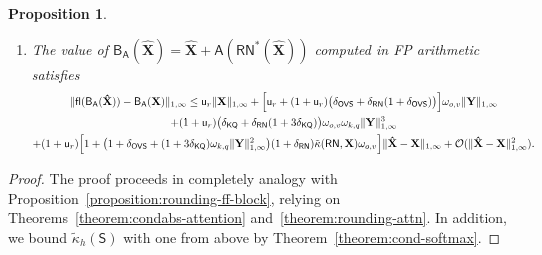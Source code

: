 \documentclass[namedate,webpdf,imanum]{ima-authoring-template}
\newcommand{\Matrix}[1]{\mathbf{#1}}
\newcommand{\Norm}[3][]{#1\| #2 #1\|_{\mathrm{#3}}}
\newcommand{\Layer}[1]{\mathsf{#1}}
\newcommand{\condabs}[3][]{\tilde{\kappa}_{\mathrm{#2}} #1( #3 #1)}
\newcommand{\fl}[2][]{\mathsf{fl}#1( #2 #1)}
\newcommand{\uh}{\mathsf{u}}
\newcommand{\Oh}[2][]{\mathcal{O}#1( #2 #1)}
\newtheorem{proposition}[theorem]{Proposition}%
\numberwithin{equation}{section}
\begin{document}
\begin{proposition}
\begin{enumerate}
\begin{multline*}
    \end{multline*}
    where $\Matrix{Y} = \Layer{RN}^*(\Matrix{X})$ and $\Tilde{\kappa}(\Layer{RN},\Matrix{X}) = \max_{1 \leq n \leq N} \condabs{\infty,\infty}{\Layer{RN},\Matrix{x}_n}$.
    \item The value of $\Layer{B}_{\Layer{A}}(\Matrix{\hat{X}}) = \Matrix{\hat{X}} + \Layer{A}(\Layer{RN}^*(\Matrix{\hat{X}}))$ computed in FP arithmetic satisfies
    \begin{multline*}
        \Norm{\fl{\Layer{B}_{\Layer{A}}(\Matrix{\hat{X}})} - \Layer{B}_{\Layer{A}}(\Matrix{X})}{1,\infty} \leq \uh_r \Norm{\Matrix{X}}{1,\infty} + \Big[ \uh_r + (1 + \uh_r) \big( \delta_{\Layer{OVS}} + \delta_{\Layer{RN}} (1 + \delta_{\Layer{OVS}}) \big) \Big] \omega_{o,v} \Norm{\Matrix{Y}}{1,\infty} \\
        + (1 + \uh_r) \big( \delta_{\Layer{KQ}} + \delta_{\Layer{RN}} (1 + 3\delta_{\Layer{KQ}}) \big) \omega_{o,v} \omega_{k,q} \Norm{\Matrix{Y}}{1,\infty}^3 \\
        + (1 + \uh_r) \Big[1 + \big( 1 + \delta_{\Layer{OVS}} + (1 + 3 \delta_{\Layer{KQ}}) \omega_{k,q} \Norm{\Matrix{Y}}{1,\infty}^2 \big) (1 + \delta_{\Layer{RN}}) \Tilde{\kappa}(\Layer{RN},\Matrix{X}) \omega_{o,v} \Big] \Norm{\Matrix{\hat{X}} - \Matrix{X}}{1,\infty} + \Oh{\Norm{\Matrix{\hat{X}} - \Matrix{X}}{1,\infty}^2}.
    \end{multline*}
\end{enumerate}
\end{proposition}
\begin{proof}
The proof proceeds in completely analogy with Proposition~\ref{proposition:rounding-ff-block}, relying on Theorems~\ref{theorem:condabs-attention} and~\ref{theorem:rounding-attn}.
In addition, we bound $\tilde{\kappa}_h(\Layer{S})$ with one from above by Theorem~\ref{theorem:cond-softmax}.
\end{proof}
\end{document}

